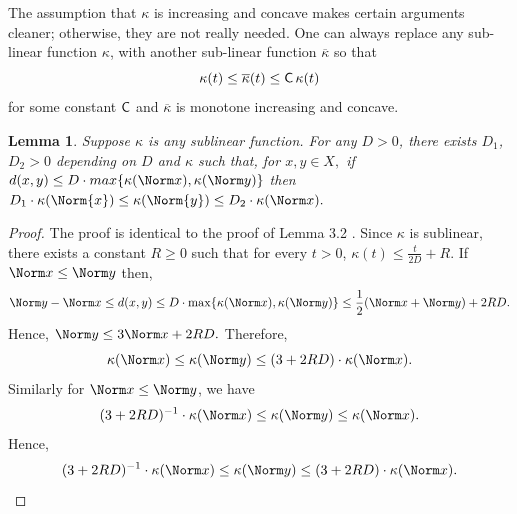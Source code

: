 \documentclass[12 pt]{amsart}
\newtheorem{lemma}[theorem]{Lemma}
\theoremstyle{definition}
\theoremstyle{remark}
\newcommand{\sC}{{\sf C}}
\newcommand{\ST}{\mathbin{\Big|}}
\begin{document}
The assumption that $\kappa$ is increasing and concave makes certain arguments
cleaner; otherwise, they are not really needed. One can always replace any 
sub-linear function $\kappa$, with another sub-linear function $\overline \kappa$
so that \[\kappa(t) \leq \overline \kappa(t) \leq \sC \, \kappa(t)\] for some constant $\sC$ 
 and $\overline \kappa$ is monotone increasing and concave.


\begin{lemma} \label{lemma2.3}
Suppose $\kappa$ is any sublinear function. For any $D>0$, there exists $D_1$, $D_2 > 0$ depending on $D$ and $\kappa$ such that, for $x, y \in X,$
if $d(x, y) \leq D\cdot max \{\kappa(\Norm x),\kappa(\Norm y)\}$ then $ D_1\cdot \kappa(\Norm{x}) \leq \kappa (\Norm{y})\leq D_2\cdot \kappa (\Norm x).$
\end{lemma}
\begin{proof}
    The proof is identical to the proof of Lemma 3.2 \cite{QRT1}. Since $\kappa$ is sublinear, there exists a constant $R\geq0$ such that for every $t>0$, $\kappa(t) \leq \frac{t}{2D}+R$.
    If $\Norm x \leq \Norm y$ then,
    \[\Norm y- \Norm x \leq d(x,y)\leq  D \cdot \max \{\kappa(\Norm x),\kappa(\Norm y)\}  \leq \frac{1}{2} (\Norm x+ \Norm y)+2RD.\]
    Hence, $\Norm y \le 3 \Norm x+2RD.$ \newline \newline
    Therefore, \[\kappa(\Norm x) \le \kappa(\Norm y)\le (3+2RD) \cdot \kappa(\Norm x).\]
    Similarly for $\Norm x \leq \Norm y$,
    we have 
    \[(3+2RD)^{-1}\cdot \kappa(\Norm x) \le \kappa(\Norm y)\le  \kappa(\Norm x).\]
    Hence,
    \[(3+2RD)^{-1}\cdot \kappa(\Norm x) \le \kappa(\Norm y)\le (3+2RD) \cdot \kappa(\Norm x).\]
\end{proof}
\end{document}
